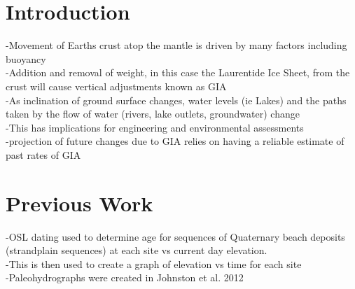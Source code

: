 \documentclass{article}
\begin{document}



\section{Introduction}
-Movement of Earths crust atop the mantle is driven by many factors including buoyancy\\
-Addition and removal of weight, in this case the Laurentide Ice Sheet, from the crust will cause vertical adjustments known as GIA\\
-As inclination of ground surface changes, water levels (ie Lakes) and the paths taken by
the flow of water (rivers, lake outlets, groundwater) change\\
-This has implications for engineering and environmental assessments\\
-projection of future changes due to GIA relies on having a reliable estimate of
past rates of GIA\\
\newpage

\section[2]{Previous Work}
-OSL dating used to determine age for sequences of Quaternary beach deposits (strandplain sequences) at each site vs current day elevation.\\
-This is then used to create a graph of elevation vs time for each site\\
-Paleohydrographs were created in Johnston et al. 2012
\newpage
\end{document}

